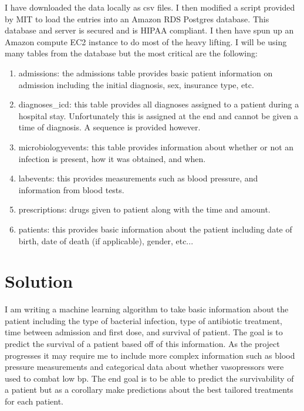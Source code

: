 \documentclass[11pt]{article}
\begin{document}
I have downloaded the data locally as csv files. I then modified a script provided by MIT to load the entries into an Amazon RDS Postgres database. This database and server is secured and is HIPAA compliant. I then have spun up an Amazon compute EC2 instance to do most of the heavy lifting. I will be using many tables from the database but the most critical are the following:
\begin{enumerate}
\item admissions: the admissions table provides basic patient information on admission including the initial diagnosis, sex, insurance type, etc.
\item diagnoses\_icd: this table provides all diagnoses assigned to a patient during a hospital stay. Unfortunately this is assigned at the end and cannot be given a time of diagnosis. A sequence is provided however.
\item microbiologyevents: this table provides information about whether or not an infection is present, how it was obtained, and when.
\item labevents: this provides measurements such as blood pressure, and information from blood tests.
\item prescriptions: drugs given to patient along with the time and amount.
\item patients: this provides basic information about the patient including date of birth, date of death (if applicable), gender, etc...
\end{enumerate}


\section{Solution}
I am writing a machine learning algorithm to take basic information about the patient including the type of bacterial infection, type of antibiotic treatment, time between admission and first dose, and survival of patient. The goal is to predict the survival of a patient based off of this information. As the project progresses it may require me to include more complex information such as blood pressure measurements and categorical data about whether vasopressors were used to combat low bp. 
The end goal is to be able to predict the survivability of a patient but as a corollary make predictions about the best tailored treatments for each patient.
\end{document}
